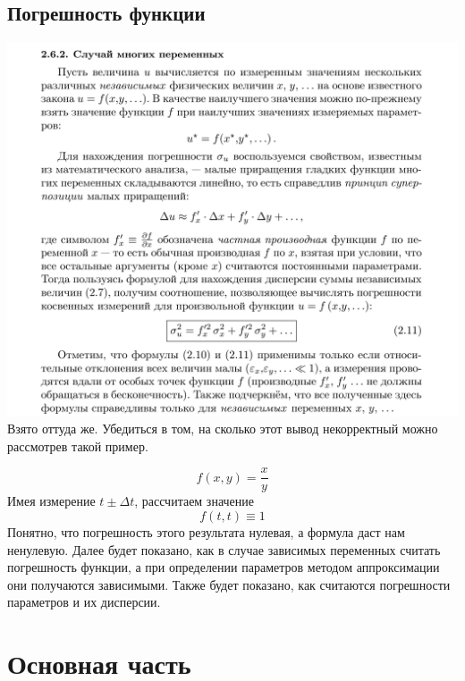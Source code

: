 \documentclass[a4paper,12pt]{article}
\begin{document}
\subsection{Погрешность функции}
\includegraphics[width=0.8\paperwidth, center]{погрешность_функции.png}
Взято оттуда же.
Убедиться в том, на сколько этот вывод некорректный можно рассмотрев такой пример.

\[ f(x, y) = \frac{x}{y} \]
Имея измерение $t \pm \Delta t$, рассчитаем значение
\[ f(t, t) \equiv 1 \]
Понятно, что погрешность этого результата нулевая, а формула даст нам
ненулевую. Далее будет показано, как в случае зависимых переменных считать погрешность
функции, а при определении параметров методом аппроксимации они получаются зависимыми.
Также будет показано, как считаются погрешности параметров и их дисперсии.


\section{Основная часть}
\end{document}
